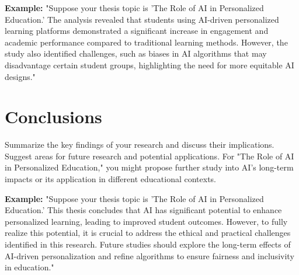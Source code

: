 \documentclass[english,f,master,binding,twoside,palatino, scrreprt]{WeSTthesis}
\begin{document}
\textbf{Example:}  
"Suppose your thesis topic is 'The Role of AI in Personalized Education.' The analysis revealed that students using AI-driven personalized learning platforms demonstrated a significant increase in engagement and academic performance compared to traditional learning methods. However, the study also identified challenges, such as biases in AI algorithms that may disadvantage certain student groups, highlighting the need for more equitable AI designs."

\chapter{Conclusions}
Summarize the key findings of your research and discuss their implications. Suggest areas for future research and potential applications. For "The Role of AI in Personalized Education," you might propose further study into AI's long-term impacts or its application in different educational contexts.

\textbf{Example:}  
"Suppose your thesis topic is 'The Role of AI in Personalized Education.' This thesis concludes that AI has significant potential to enhance personalized learning, leading to improved student outcomes. However, to fully realize this potential, it is crucial to address the ethical and practical challenges identified in this research. Future studies should explore the long-term effects of AI-driven personalization and refine algorithms to ensure fairness and inclusivity in education."


%

\end{document}
